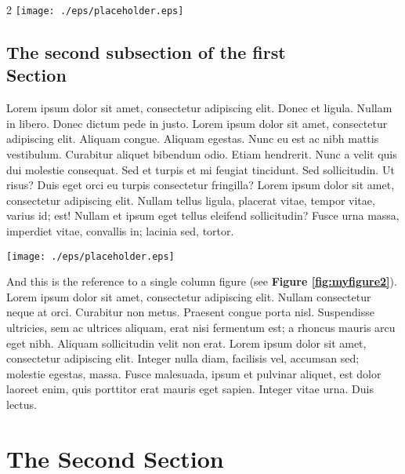 \documentclass[a4paper,10pt]{article}
\makeatletter
\newenvironment{figurehere}{\def\@captype{figure}\vspace{2ex}}{\vspace{2ex}}
\makeatother
\begin{document}
\begin{multicols}{2}
\begin{figurehere}
 \centering
 \texttt{[image: ./eps/placeholder.eps]}
 \caption{Some single-column figure caption.}
 \label{fig:myfigure1}
\end{figurehere}


\subsection{The second subsection of the first \\ Section}

Lorem ipsum dolor sit amet, consectetur adipiscing elit. Donec et ligula. Nullam
in libero. Donec dictum pede in justo. Lorem ipsum dolor sit amet, consectetur
adipiscing elit. Aliquam congue. Aliquam egestas. Nunc eu est ac nibh mattis
vestibulum. Curabitur aliquet bibendum odio. Etiam hendrerit. Nunc a velit quis
dui molestie consequat. Sed et turpis et mi feugiat tincidunt. Sed sollicitudin.
Ut risus? Duis eget orci eu turpis consectetur fringilla? Lorem ipsum dolor sit
amet, consectetur adipiscing elit. Nullam tellus ligula, placerat vitae, tempor
vitae, varius id; est! Nullam et ipsum eget tellus eleifend sollicitudin? Fusce
urna massa, imperdiet vitae, convallis in; lacinia sed, tortor.

\begin{figure*}[t]
  \centering
 \texttt{[image: ./eps/placeholder.eps]}
 \caption{Some wide-figure caption.}
 \label{fig:myfigure2}
\end{figure*}

And this is the reference to a single column figure (see {\bf Figure
\ref{fig:myfigure2}}). Lorem ipsum dolor sit amet, consectetur adipiscing elit.
Nullam consectetur neque at orci. Curabitur non metus. Praesent congue porta
nisl. Suspendisse ultricies, sem ac ultrices aliquam, erat nisi fermentum est; a
rhoncus mauris arcu eget nibh. Aliquam sollicitudin velit non erat. Lorem ipsum
dolor sit amet, consectetur adipiscing elit. Integer nulla diam, facilisis vel,
accumsan sed; molestie egestas, massa. Fusce malesuada, ipsum et pulvinar
aliquet, est dolor laoreet enim, quis porttitor erat mauris eget sapien. Integer
vitae urna. Duis lectus.

\section{The Second Section}


\end{multicols}
\end{document}
